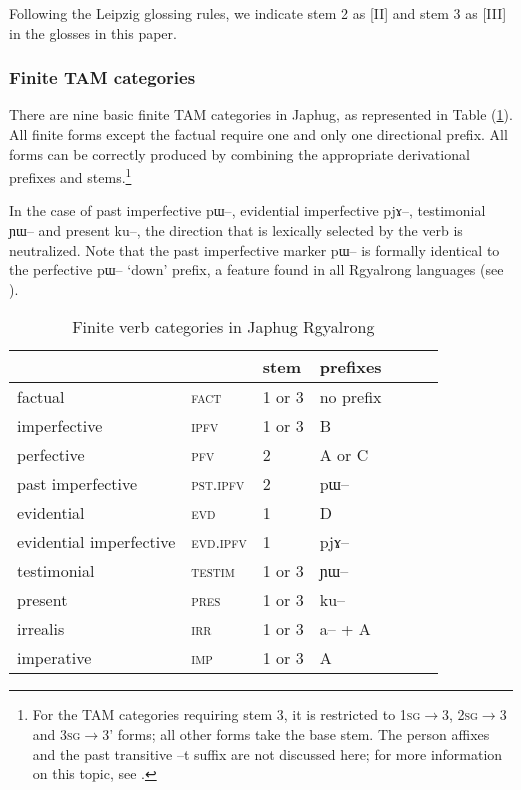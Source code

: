 \documentclass[oldfontcommands,oneside,a4paper,11pt]{article}
\newcommand{\ipa}[1]{{\phon \mbox{#1}}} %
\newcommand{\refb}[1]{(\ref{#1})}
\begin{document}
Following the Leipzig glossing rules, we indicate stem 2 as [II] and stem 3 as [III] in the glosses in this paper.
\subsubsection{Finite TAM categories} \label{sec:finite.TAM}

There are nine basic finite TAM categories in Japhug, as represented in Table \refb{tab:finite.forms}. All finite forms except the factual require one and only one directional prefix. All forms can be correctly produced by combining the appropriate derivational prefixes and stems.\footnote{For the TAM categories requiring stem 3, it is restricted to  \textsc{1sg}$\rightarrow$3, \textsc{2sg}$\rightarrow$3 and \textsc{3sg}$\rightarrow$3' forms; all other forms take the base stem.  The person affixes and the past transitive \ipa{--t} suffix are not discussed here; for  more information on this topic, see \citet{jacques10inverse}.}


In the case of past imperfective \ipa{pɯ--}, evidential imperfective \ipa{pjɤ--}, testimonial \ipa{ɲɯ--} and present \ipa{ku--}, the direction that is lexically selected by the verb is neutralized. Note that the past imperfective marker \ipa{pɯ--} is formally identical to the perfective \ipa{pɯ--} `down' prefix, a feature found in all Rgyalrong languages (see \citealt{lin11direction}).

\begin{table}
\caption{Finite verb categories in Japhug Rgyalrong} \label{tab:finite.forms} \centering
\begin{tabular}{lllllll}
\toprule
&	&	stem&	prefixes\\
\midrule
factual&	\textsc{fact} &	1 or 3&	no prefix\\
imperfective&	\textsc{ipfv} &	1 or 3&	B\\
perfective&	\textsc{pfv} &	2&	A or C\\
past imperfective&	\textsc{pst.ipfv} &	2&	\ipa{pɯ--}\\
evidential&	\textsc{evd} &	1&	D\\
evidential imperfective&	\textsc{evd.ipfv} &	1&	\ipa{pjɤ--}\\
testimonial&	\textsc{testim} &	1 or 3&	\ipa{ɲɯ--}\\
present&	\textsc{pres} &	1 or 3&	\ipa{ku--}\\
irrealis&	\textsc{irr} &	1 or 3&	\ipa{a--} + A\\
imperative&	\textsc{imp} &	1 or 3&	A\\
\bottomrule
\end{tabular}
\end{table}
\end{document}
